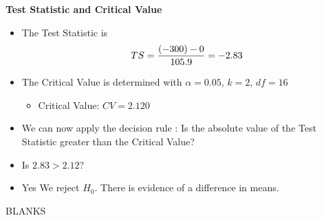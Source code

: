 \documentclass[a4paper,12pt]{article}
\begin{document}
\newpage 
\noindent \textbf{Test Statistic and Critical Value}\\
\begin{itemize}
\item The Test Statistic is \[ TS  = {(-300) - 0 \over 105.9}  = -2.83 \]
\item The Critical Value is determined with $\alpha = 0.05$, $k=2$, $df = 16 $
\begin{itemize}
\item Critical Value: $CV = 2.120$
\end{itemize}
\item We can now apply the decision rule : Is the absolute value of the Test Statistic greater than the Critical Value?
\item Is $2.83 > 2.12$? 
\item Yes We reject $H_0$. There is evidence of a difference in means.
\end{itemize}
\newpage 
BLANKS
\end{document}
